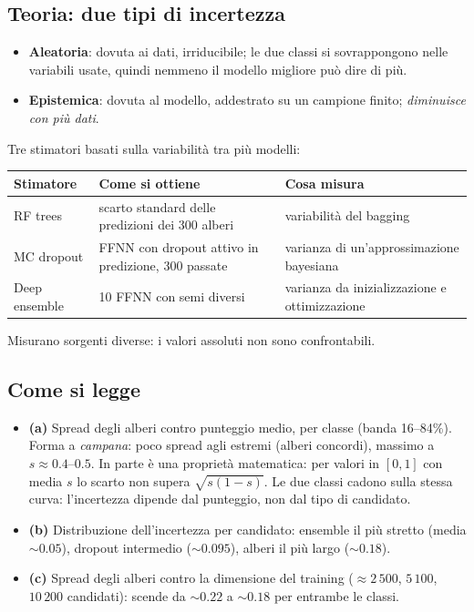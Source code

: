 \documentclass[10.5pt,a4paper]{article}
\begin{document}
\subsection*{Teoria: due tipi di incertezza}
\begin{itemize}
\item \textbf{Aleatoria}: dovuta ai dati, irriducibile; le due classi si sovrappongono nelle variabili usate, quindi nemmeno il
modello migliore può dire di più.
\item \textbf{Epistemica}: dovuta al modello, addestrato su un campione finito; \emph{diminuisce con più dati}.
\end{itemize}
Tre stimatori basati sulla variabilità tra più modelli:
\begin{center}\small\begin{tabular}{p{2.6cm}p{6.4cm}p{5.2cm}}\toprule
Stimatore & Come si ottiene & Cosa misura\\\midrule
RF trees & scarto standard delle predizioni dei 300 alberi & variabilità del bagging\\
MC dropout & FFNN con dropout attivo in predizione, 300 passate & varianza di un'approssimazione bayesiana\\
Deep ensemble & 10 FFNN con semi diversi & varianza da inizializzazione e ottimizzazione\\\bottomrule
\end{tabular}\end{center}
Misurano sorgenti diverse: i valori assoluti non sono confrontabili.

\subsection*{Come si legge}
\begin{itemize}
\item \textbf{(a)} Spread degli alberi contro punteggio medio, per classe (banda 16--84\%). Forma a \emph{campana}: poco spread agli
estremi (alberi concordi), massimo a $s\approx0.4$--$0.5$. In parte è una proprietà matematica: per valori in $[0,1]$ con media $s$
lo scarto non supera $\sqrt{s(1-s)}$. Le due classi cadono sulla stessa curva: l'incertezza dipende dal punteggio, non dal tipo di
candidato.
\item \textbf{(b)} Distribuzione dell'incertezza per candidato: ensemble il più stretto (media $\sim0.05$), dropout intermedio
($\sim0.095$), alberi il più largo ($\sim0.18$).
\item \textbf{(c)} Spread degli alberi contro la dimensione del training ($\approx2\,500$, $5\,100$, $10\,200$ candidati): scende da
$\sim0.22$ a $\sim0.18$ per entrambe le classi.
\end{itemize}
\end{document}
